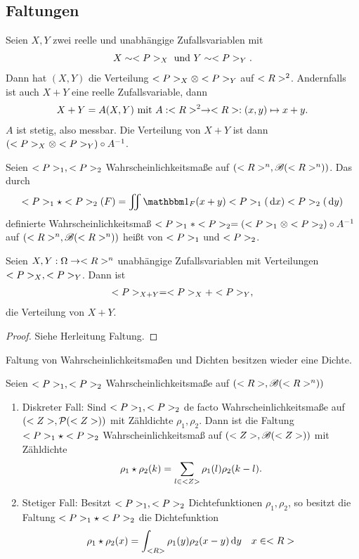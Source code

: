 \subsection*{Faltungen}
Seien $X, Y$ zwei reelle und unabhängige Zufallsvariablen mit 
\begin{align*}
	X \sim \P_X \und Y \sim \P_Y.
\end{align*}
Dann hat $(X,Y)$ die Verteilung $\P_X \otimes \P_Y$ auf $\R^2$. Andernfalls ist auch $X+Y$ eine reelle Zufallsvariable, dann
\begin{align*}
	X + Y = A(X,Y) \mit A: \R^2 \to \R: (x,y) \mapsto x + y.
\end{align*}
$A$ ist stetig, also messbar. Die Verteilung von $X+Y$ ist dann $(\P_X \otimes \P_Y)\circ A^{-1}$.
\begin{definition}[Faltung]
	Seien $\P_1 , \P_2$ Wahrscheinlichkeitsmaße auf $(\Rn, \borel(\Rn))$. Das durch
	\begin{align*}
		\P_1 \star \P_2(F) = \iint \indi_F (x+y) \P_1 (\d x)\P_2 (\d y)
	\end{align*}
	definierte Wahrscheinlichkeitsmaß $\P_1 \ast \P_2 = (\P_1 \otimes \P_2) \circ A^{-1}$ auf $(\Rn, \borel(\Rn))$ heißt  von $\P_1$ und $\P_2$.
\end{definition}
\begin{proposition}
	Seien $X,Y: \O \to \Rn$ unabhängige Zufallsvariablen mit Verteilungen $\P_X, \P_Y$. Dann ist
	\begin{align*}
		\P_{X+Y} = \P_X + \P_Y,
	\end{align*}
	die Verteilung von $X +  Y$.
\end{proposition}
\begin{proof}
	Siehe Herleitung Faltung.
\end{proof}
Faltung von Wahrscheinlichkeitsmaßen und Dichten besitzen wieder eine Dichte.
\begin{proposition}
	Seien $\P_1 , \P_2$ Wahrscheinlichkeitsmaße auf $(\R, \borel(\Rn))$
	\begin{enumerate}
		\item Diskreter Fall: Sind $\P_1 , \P_2$ de facto Wahrscheinlichkeitsmaße auf $(\Z, \pows(\Z))$ mit Zähldichte $\rho_1 , \rho_2$. Dann ist die Faltung $\P_1 \star \P_2$ Wahrscheinlichkeitsmaß auf $(\Z, \borel(\Z))$ mit Zähldichte
		\begin{align*}
			\rho_1 \star \rho_2 (k) = \sum_{l \in \Z} \rho_1 (l) \rho_2 (k-l).
		\end{align*}
		\item Stetiger Fall: Besitzt $\P_1 , \P_2$ Dichtefunktionen $\rho_1, \rho_2$, so besitzt die Faltung $\P_1 \star \P_2$ die Dichtefunktion
		\begin{align*}
			\rho_1 \star \rho_2 (x) = \int_{\R} \rho_1 (y) \rho_2 (x-y) \d y \quad x \in \R
		\end{align*}
	\end{enumerate}
\end{proposition}
